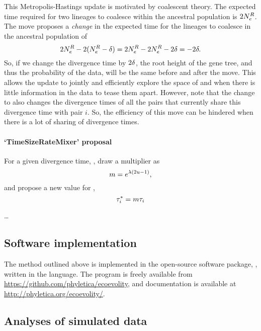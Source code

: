 This Metropolis-Hastings update is motivated by coalescent theory.
The expected time required for two lineages to coalesce within the
ancestral population is $2\epopsize[\rootpopindex]$.
The move proposes a \emph{change} in the expected time for the lineages to
coalesce in the ancestral population of
\[
    2\epopsize[\rootpopindex] - 2(\epopsize[\rootpopindex] - \sizechange) =
    2\epopsize[\rootpopindex] - 2\epopsize[\rootpopindex] - 2\sizechange =
    -2\sizechange.
\]
So, if we change the divergence time by $2\sizechange$, the root height of the
gene tree, and thus the probability of the data, will be the same before and
after the move.
This allows the update to jointly and efficiently explore the space of \divtime
and \epopsize[\rootpopindex] when there is little information in the data to
tease them apart.
However, note that the change to \divtime also changes the divergence times
of all the pairs that currently share this divergence time with pair $i$.
So, the efficiency of this move can be hindered when there is a lot of sharing
of divergence times.

\paragraph{`TimeSizeRateMixer' proposal}

For a given divergence time, \divtime[i], draw a multiplier as
\[
    \multiplier = e^{\tuningparameter(2\uniformdeviate - 1)},
\]
and propose a new value for \divtime[i],
\[
    \divtime[i]\proposed = \multiplier\divtime[i]
\]

\ldots

\subsection{Software implementation}
The method outlined above is implemented in the open-source software package,
\ecoevolity, written in the \cpp language.
The program is freely available from
\url{https://github.com/phyletica/ecoevolity}, and documentation is available
at
\url{http://phyletica.org/ecoevolity/}.


\subsection{Analyses of simulated data}

